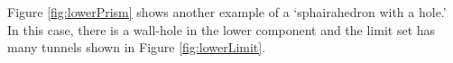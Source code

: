 \documentclass[suppldata, dvipdfmx]{interact}
\theoremstyle{plain}%
\theoremstyle{definition}
\theoremstyle{remark}
\theoremstyle{problemstyle}
\begin{document}
%
%
%

Figure \ref{fig:lowerPrism} shows another example of a `sphairahedron with a hole.'  In this case, there is a wall-hole in the lower component and the limit set has many tunnels shown in Figure \ref{fig:lowerLimit}.



\end{document}
